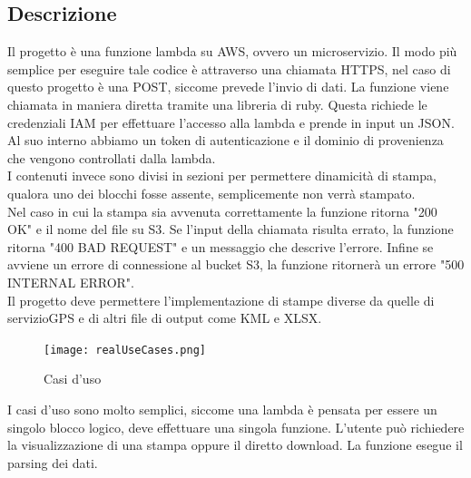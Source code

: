 \documentclass[12pt]{article}
\begin{document}
\subsection{Descrizione}
Il progetto è una funzione lambda su AWS, ovvero un microservizio.
Il modo più semplice per eseguire tale codice è attraverso una chiamata 
HTTPS, nel caso di questo progetto è una POST, siccome prevede l'invio di dati.
La funzione viene chiamata in maniera diretta tramite una libreria di ruby.
Questa richiede le credenziali IAM per effettuare l'accesso alla lambda e prende 
in input un JSON. Al suo interno abbiamo un token di autenticazione e il dominio 
di provenienza che vengono controllati dalla lambda. 
\\ I contenuti invece sono divisi in sezioni per permettere dinamicità di stampa, 
qualora uno dei blocchi fosse assente, semplicemente non verrà stampato. 
\\ Nel caso in cui la stampa sia avvenuta correttamente la funzione ritorna 
"200 OK"
e il nome del file su S3. Se l'input della chiamata risulta errato, la funzione ritorna 
"400 BAD REQUEST"
e un messaggio che descrive l'errore. Infine se avviene un errore di connessione 
al bucket S3, la funzione ritornerà un errore "500 INTERNAL ERROR".    
\\ Il progetto deve permettere l'implementazione di stampe diverse da quelle di servizioGPS
e di altri file di output come KML e XLSX. 

\begin{figure}[H]
\texttt{[image: realUseCases.png]}
\caption{Casi d'uso}
\end{figure}
I casi d'uso sono molto semplici, siccome una lambda è pensata per essere 
un singolo blocco logico, deve effettuare una singola funzione.
L'utente può richiedere la visualizzazione di una stampa oppure il diretto 
download. La funzione esegue il parsing dei dati.
\end{document}
